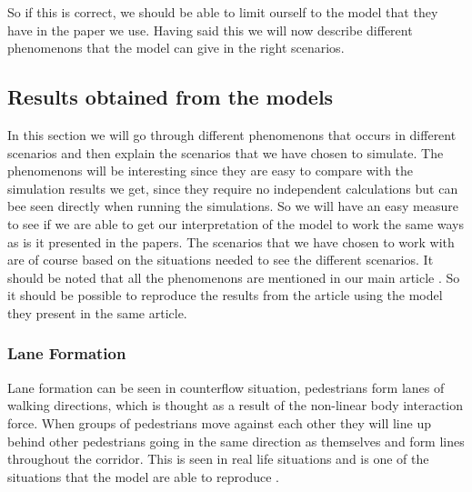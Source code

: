 So if this is correct, we should be able to limit ourself to the model that they have in the paper we use. Having said this we will now describe different phenomenons that the model can give in the right scenarios.  





\subsection{Results obtained from the models}
In this section we will go through different phenomenons that occurs in different scenarios and then explain the scenarios that we have chosen to simulate. The phenomenons will be interesting since they are easy to compare with the simulation results we get, since they require no independent calculations but can bee seen directly when running the simulations. So we will have an easy measure to see if we are able to get our interpretation of the model to work the same ways as is it presented in the papers. The scenarios that we have chosen to work with are of course based on the situations needed to see the different scenarios. It should be noted that all the phenomenons are mentioned in our main article \cite{self-org}. So it should be possible to reproduce the results from the article using the model they present in the same article. 

\subsubsection{Lane Formation}
Lane formation can be seen in counterflow situation, pedestrians form lanes of walking 
directions, which is thought as a result of the non-linear body interaction 
force. When groups of pedestrians move against each other they will line up behind other pedestrians going in the same direction as themselves and form lines throughout the corridor. This is seen in real life situations and is one of the situations that the model are able to reproduce \cite{self-org}. 



